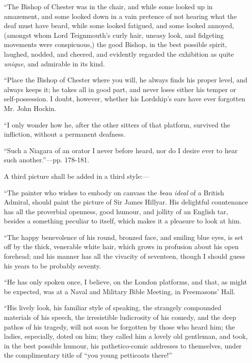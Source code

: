 ``The
Bishop of Chester was in the chair, and while some looked up in
amazement, and some looked down in a vain pretence of not hearing what
the deaf must have beard, while some looked fatigued, and some looked
annoyed, (amongst whom Lord Teignmouth's curly hair, uneasy look, and
fidgeting movements were conspicuous,) the good Bishop, in the best
possible spirit, laughed, nodded, and cheered, and evidently regarded
the exhibition as quite \emph{unique}, and admirable in its kind.

``Place
the Bishop of Chester where you will, he always finds his proper level,
and always keeps it; he takes all in good part, and never loses either
his temper or self-possession. I doubt, however, whether his Lordship's
ears have ever forgotten Mr. John Hockin.

``I
only wonder how he, after the other sitters of that platform, survived
the infliction, without a permanent deafness.

``Such
a Niagara of an orator I never before heard, nor do I desire ever to
hear such another.''—pp. 178-181.

A third
picture shall be added in a third style:—

``The
painter who wishes to embody on canvass the \emph{beau ideal} of a
British Admiral, should paint the picture of Sir James Hillyar. His
delightful countenance has all the proverbial openness, good humour, and
jollity of an English tar, besides a something peculiar to itself, which
makes it a pleasure to look at him.

``The
happy benevolence of his round, bronzed face, and smiling blue eyes, is
set off by the thick, venerable white hair, which grows in profusion
about his open forehead; and his manner has all the vivacity of
seventeen, though I should guess his years to be probably seventy.

``He
has only spoken once, I believe, on the London platforms, and that, as
might be expected, was at a Naval and Military Bible Meeting, in
Freemasons' Hall.

``His
lively look, his familiar style of speaking, the strangely compounded
materials of his speech, the irresistible ludicrosity of his comedy, and
the deep pathos of his tragedy, will not soon be forgotten by those who
heard him; the ladies, especially, doted on him; they called him a
lovely old gentleman, and took, in the best possible humour, his
pathetico-comic addresses to themselves, under the complimentary title
of ``you young petticoats there!''

